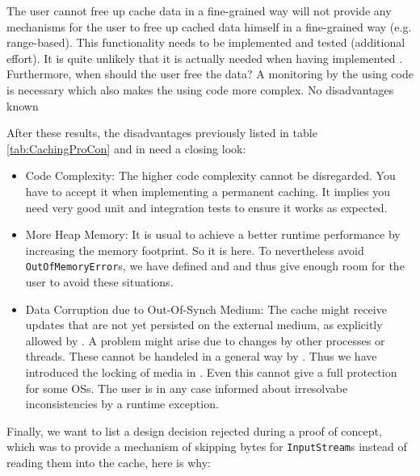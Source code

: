 {%
The user cannot free up cache data in a fine-grained way
}
{%
\COMPmedia{} will not provide any mechanisms for the user to free up cached data himself in a fine-grained way (e.g. range-based).
}
{%
This functionality needs to be implemented and tested (additional effort). It is quite unlikely that it is actually needed when having implemented . Furthermore, when should the user free the data? A monitoring by the using code is necessary which also makes the using code more complex.
}
{%
No disadvantages known
}

After these results, the disadvantages previously listed in table \hyperref[tab:CachingProCon]{\ref{tab:CachingProCon}} and in  need a closing look:
\begin{itemize}
\item Code Complexity: The higher code complexity cannot be disregarded. You have to accept it when implementing a permanent caching. It implies you need very good unit and integration tests to ensure it works as expected.
\item More Heap Memory: It is usual to achieve a better runtime performance by increasing the memory footprint. So it is here. To nevertheless avoid \texttt{OutOfMemoryError}s, we have defined  and  and thus give enough room for the user to avoid these situations.
\item Data Corruption due to Out-Of-Synch Medium: The cache might receive updates that are not yet persisted on the external medium, as explicitly allowed by  . A problem might arise due to changes by other processes or threads. These cannot be handeled in a general way by \LibName{}. Thus we have introduced the locking of media in . Even this cannot give a full protection for some OSs. The user is in any case informed about irresolvabe inconsistencies by a runtime exception.
\end{itemize}

Finally, we want to list a design decision rejected during a proof of concept, which was to provide a mechanism of skipping bytes for \texttt{InputStream}s instead of reading them into the cache, here is why:

